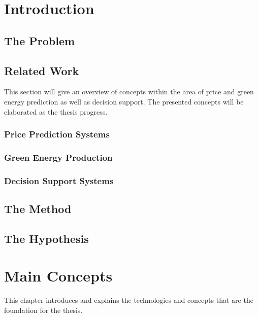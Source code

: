 \documentclass[twoside,11pt,openright]{report}
\begin{document}
\tableofcontents
{}
\setcounter{secnumdepth}{2}


\chapter{Introduction}
\label{ch:intro}
\section{The Problem}

\section{Related Work}
This section will give an overview of concepts within the area of price and green energy prediction as well as decision support. The presented concepts will be elaborated as the thesis progress.
\subsection{Price Prediction Systems}


\subsection{Green Energy Production}



\subsection{Decision Support Systems}


\section{The Method}


\section{The Hypothesis}




\chapter{Main Concepts}
This chapter introduces and explains the technologies and concepts that are the foundation for the thesis.
\label{ch:foundations}
\end{document}
